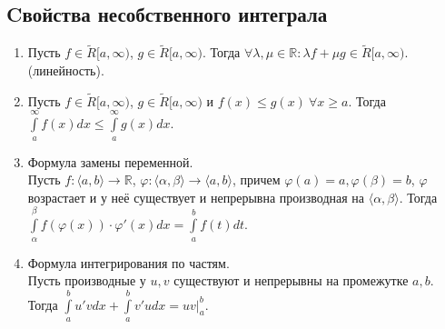 \subsection{Cвойства несобственного интеграла}
\begin{enumerate}

\item Пусть $f\in \tilde R[a,\infty)$, $g\in \tilde R[a,\infty)$.
Тогда  
$\forall \lambda,\mu\in \mathbb{R}:\lambda f+\mu g\in \tilde R[a,\infty)$.
(линейность).

\item Пусть $f\in \tilde R[a,\infty)$,  $g\in \tilde R[a,\infty)$ и
    $f(x)\leqslant g(x)~\forall x\geqslant a$. Тогда
    $\int\limits_{a}^{\infty}f(x)dx\leqslant \int\limits_{a}^{\infty}g(x)dx$.

\item Формула замены переменной.\\
    Пусть $f\colon\langle a,b \rangle\to \mathbb{R}$, 
    $\varphi\colon\langle \alpha,\beta\rangle\to\langle a,b\rangle$,
    причем $\varphi(a)=a,\varphi(\beta)=b$, $\varphi$ возрастает и у неё 
    существует и непрерывна производная на $\langle\alpha,\beta\rangle$.
    Тогда $\int\limits_{\alpha}^{\beta}f(\varphi(x))\cdot \varphi'(x)dx=
    \int\limits_{a}^{b} f(t)dt$.


\item Формула интегрирования по частям.\\
    Пусть производные у $u,v$ существуют и непрерывны на промежутке  $a,b$.
    Тогда  $ \int\limits_{a}^{b}u'vdx+\int\limits_{a}^{b}v'udx=uv\Big|^b_a$.
\end{enumerate}

 
